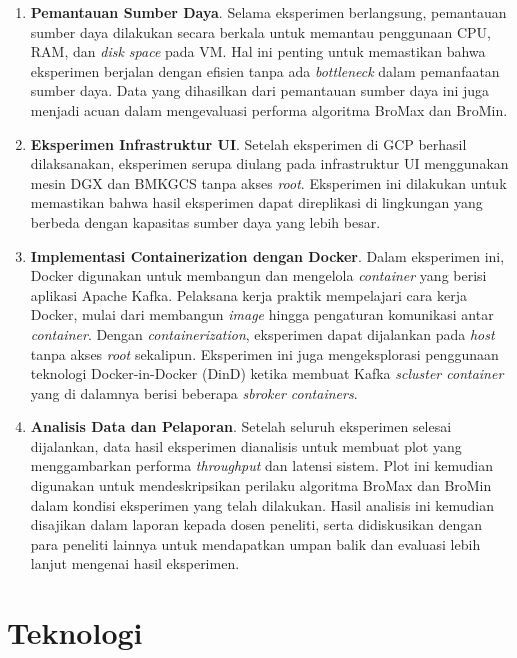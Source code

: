 \begin{enumerate}
	\item \textbf{Pemantauan Sumber Daya}. Selama eksperimen berlangsung, pemantauan sumber daya dilakukan secara berkala untuk memantau penggunaan CPU, RAM, dan \textit{disk space} pada VM. Hal ini penting untuk memastikan bahwa eksperimen berjalan dengan efisien tanpa ada \textit{bottleneck} dalam pemanfaatan sumber daya. Data yang dihasilkan dari pemantauan sumber daya ini juga menjadi acuan dalam mengevaluasi performa algoritma BroMax dan BroMin.

	\item \textbf{Eksperimen Infrastruktur UI}. Setelah eksperimen di GCP berhasil dilaksanakan, eksperimen serupa diulang pada infrastruktur UI menggunakan mesin DGX dan BMKGCS tanpa akses \textit{root}. Eksperimen ini dilakukan untuk memastikan bahwa hasil eksperimen dapat direplikasi di lingkungan yang berbeda dengan kapasitas sumber daya yang lebih besar.

	\item \textbf{Implementasi Containerization dengan Docker}. Dalam eksperimen ini, Docker digunakan untuk membangun dan mengelola \textit{container} yang berisi aplikasi Apache Kafka. Pelaksana kerja praktik mempelajari cara kerja Docker, mulai dari membangun \textit{image} hingga pengaturan komunikasi antar \textit{container}. Dengan \textit{containerization}, eksperimen dapat dijalankan pada \textit{host} tanpa akses \textit{root} sekalipun. Eksperimen ini juga mengeksplorasi penggunaan teknologi Docker-in-Docker (DinD) ketika membuat Kafka \textit{scluster container} yang di dalamnya berisi beberapa \textit{sbroker containers}.

	\item \textbf{Analisis Data dan Pelaporan}. Setelah seluruh eksperimen selesai dijalankan, data hasil eksperimen dianalisis untuk membuat plot yang menggambarkan performa \textit{throughput} dan latensi sistem. Plot ini kemudian digunakan untuk mendeskripsikan perilaku algoritma BroMax dan BroMin dalam kondisi eksperimen yang telah dilakukan. Hasil analisis ini kemudian disajikan dalam laporan kepada dosen peneliti, serta didiskusikan dengan para peneliti lainnya untuk mendapatkan umpan balik dan evaluasi lebih lanjut mengenai hasil eksperimen.

\end{enumerate}

\section{Teknologi}

